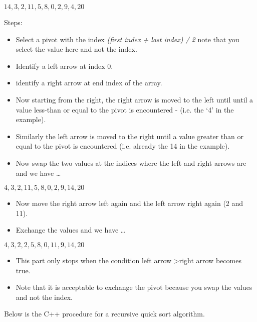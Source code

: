 \begin{center}
$14, 3, 2, 11, 5, 8, 0, 2, 9, 4, 20$\\
\end{center}

\noindent
Steps:
\begin{itemize}
	\item Select a pivot with the index \emph{(first index + last index) / 2} note that you
	select the value here and not the index.
	\item Identify a left arrow at index 0.
	\item identify a right arrow at end index of the array.
	\item Now starting from the right, the right arrow is moved to the left until
	until a value less-than or equal to the pivot is encountered - (i.e. the `4' in the example).
	\item Similarly the left arrow is moved to the right until a value greater than or equal to 
	the pivot is encountered (i.e. already the 14 in the example).
	\item Now swap the two values at the indices where the left and right arrows are and we
	have \ldots
\end{itemize}

\begin{center}
$4, 3, 2, 11, 5, 8, 0, 2, 9, 14, 20$\\
\end{center}

\begin{itemize}
	\item Now move the right arrow left again and the left arrow right again (2 and 11).
	\item Exchange the values and we have \ldots
\end{itemize}

\begin{center}
$4, 3, 2, 2, 5, 8, 0, 11, 9, 14, 20$\\
\end{center}

\begin{itemize}
	\item This part only stops when the condition left arrow \textgreater right arrow becomes true.
	\item Note that it is acceptable to exchange the pivot because you swap the values and not
	the index.
\end{itemize}


\noindent
Below is the C++ procedure for a recursive quick sort algorithm.

